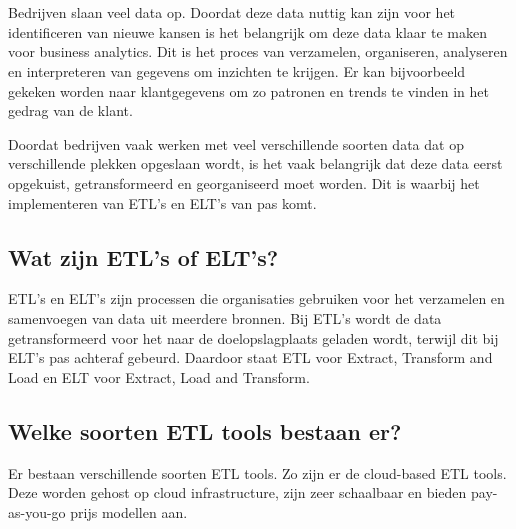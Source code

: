\chapter{}%
\label{ch:stand-van-zaken}



Bedrijven slaan veel data op. Doordat deze data nuttig kan zijn voor het identificeren van nieuwe kansen is het belangrijk om deze data klaar te maken voor business analytics. Dit is het proces van verzamelen, organiseren, analyseren en interpreteren van gegevens om inzichten te krijgen. Er kan bijvoorbeeld gekeken worden naar klantgegevens om zo patronen en trends te vinden in het gedrag van de klant.~\autocite{PratibhaKumari2023}

Doordat bedrijven vaak werken met veel verschillende soorten data dat op verschillende plekken opgeslaan wordt, is het vaak belangrijk dat deze data eerst opgekuist, getransformeerd en georganiseerd moet worden. Dit is waarbij het implementeren van ETL's en ELT's van pas komt.~\autocite{Inmon2023}

\section{Wat zijn ETL's of ELT's?}

ETL's en ELT's zijn processen die organisaties gebruiken voor het verzamelen en samenvoegen van data uit meerdere bronnen. Bij ETL's wordt de data getransformeerd voor het naar de doelopslagplaats geladen wordt, terwijl dit bij ELT's pas achteraf gebeurd. Daardoor staat ETL voor Extract, Transform and Load en ELT voor Extract, Load and Transform.~\autocite{Bartley2023}

\section{Welke soorten ETL tools bestaan er?}

Er bestaan verschillende soorten ETL tools. Zo zijn er de cloud-based ETL tools. Deze worden gehost op cloud infrastructure, zijn zeer schaalbaar en bieden pay-as-you-go prijs modellen aan.~\autocite{Ethan2024}

